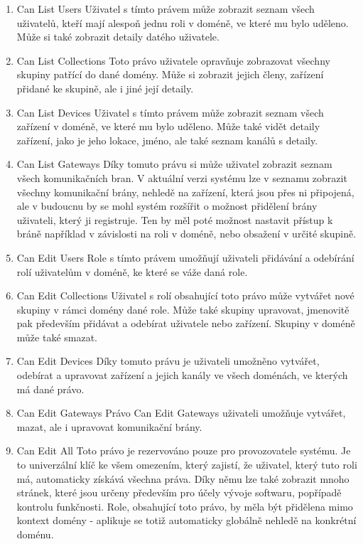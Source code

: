 { %
\renewcommand{\labelenumi}{P\arabic{enumi}}
\begin{enumerate}
\item{Can List Users}
Uživatel s tímto právem může zobrazit seznam všech uživatelů, kteří mají alespoň jednu roli v doméně, ve které mu bylo uděleno. Může si také zobrazit detaily datého uživatele.
\item{Can List Collections}
Toto právo uživatele opravňuje zobrazovat všechny skupiny patřící do dané domény. Může si zobrazit jejich členy, zařízení přidané ke skupině, ale i jiné její detaily.
\item{Can List Devices}
Uživatel s tímto právem může zobrazit seznam všech zařízení v doméně, ve které mu bylo uděleno. Může také vidět detaily zařízení, jako je jeho lokace, jméno, ale také seznam kanálů s detaily.
\item{Can List Gateways}
Díky tomuto právu si může uživatel zobrazit seznam všech komunikačních bran. V aktuální verzi systému lze v seznamu zobrazit všechny komunikační brány, nehledě na zařízení, která jsou přes ni připojená, ale v budoucnu by se mohl systém rozšířit o možnost přidělení brány uživateli, který ji registruje. Ten by měl poté možnost nastavit přístup k bráně například v závislosti na roli v doméně, nebo obsažení v určité skupině.
\item{Can Edit Users}
Role s tímto právem umožňují uživateli přidávání a odebírání rolí uživatelům v doméně, ke které se váže daná role.
\item{Can Edit Collections}
Uživatel s rolí obsahující toto právo může vytvářet nové skupiny v rámci domény dané role. Může také skupiny upravovat, jmenovitě pak především přidávat a odebírat uživatele nebo zařízení. Skupiny v doméně může také smazat.
\item{Can Edit Devices}
Díky tomuto právu je uživateli umožněno vytvářet, odebírat a upravovat zařízení a jejich kanály ve všech doménách, ve kterých má dané právo.
\item{Can Edit Gateways}
Právo Can Edit Gateways uživateli umožňuje vytvářet, mazat, ale i upravovat komunikační brány.
\item{Can Edit All}
Toto právo je rezervováno pouze pro provozovatele systému. Je to univerzální klíč ke všem omezením, který zajistí, že uživatel, který tuto roli má, automaticky získává všechna práva. Díky němu lze také zobrazit mnoho stránek, které jsou určeny především pro účely vývoje softwaru, popřípadě kontrolu funkčnosti. Role, obsahující toto právo, by měla být přidělena mimo kontext domény - aplikuje se totiž automaticky globálně nehledě na konkrétní doménu.
\end{enumerate}
} %

